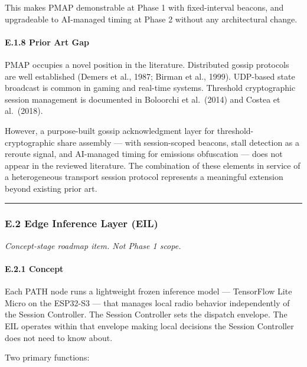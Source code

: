 \documentclass[
  11pt,
]{article}
\begin{document}
This makes PMAP demonstrable at Phase 1 with fixed-interval beacons, and
upgradeable to AI-managed timing at Phase 2 without any architectural
change.

\hypertarget{e.1.8-prior-art-gap}{%
\paragraph{E.1.8 Prior Art Gap}\label{e.1.8-prior-art-gap}}

PMAP occupies a novel position in the literature. Distributed gossip
protocols are well established (Demers et al., 1987; Birman et al.,
1999). UDP-based state broadcast is common in gaming and real-time
systems. Threshold cryptographic session management is documented in
Boloorchi et al.~(2014) and Costea et al.~(2018).

However, a purpose-built gossip acknowledgment layer for
threshold-cryptographic share assembly --- with session-scoped beacons,
stall detection as a reroute signal, and AI-managed timing for emissions
obfuscation --- does not appear in the reviewed literature. The
combination of these elements in service of a heterogeneous transport
session protocol represents a meaningful extension beyond existing prior
art.

\begin{center}\rule{0.5\linewidth}{0.5pt}\end{center}

\hypertarget{e.2-edge-inference-layer-eil}{%
\subsubsection{E.2 Edge Inference Layer
(EIL)}\label{e.2-edge-inference-layer-eil}}

\emph{Concept-stage roadmap item. Not Phase 1 scope.}

\hypertarget{e.2.1-concept}{%
\paragraph{E.2.1 Concept}\label{e.2.1-concept}}

Each PATH node runs a lightweight frozen inference model --- TensorFlow
Lite Micro on the ESP32-S3 --- that manages local radio behavior
independently of the Session Controller. The Session Controller sets the
dispatch envelope. The EIL operates within that envelope making local
decisions the Session Controller does not need to know about.

Two primary functions:
\end{document}
